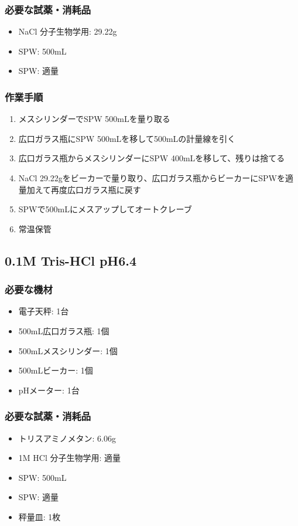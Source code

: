 \documentclass[titlepage,10pt,a4paper,uplatex]{jsbook}
\begin{document}
\subsubsection{必要な試薬・消耗品}
\begin{itemize}
\item NaCl 分子生物学用: 29.22g
\item SPW: 500mL
\item SPW: 適量
\end{itemize}

\subsubsection{作業手順}
\begin{enumerate}
\item メスシリンダーでSPW 500mLを量り取る
\item 広口ガラス瓶にSPW 500mLを移して500mLの計量線を引く
\item 広口ガラス瓶からメスシリンダーにSPW 400mLを移して、残りは捨てる
\item NaCl 29.22gをビーカーで量り取り、広口ガラス瓶からビーカーにSPWを適量加えて再度広口ガラス瓶に戻す
\item SPWで500mLにメスアップしてオートクレーブ
\item 常温保管
\end{enumerate}

\subsection{0.1M Tris-HCl pH6.4}

\subsubsection{必要な機材}
\begin{itemize}
\item 電子天秤: 1台
\item 500mL広口ガラス瓶: 1個
\item 500mLメスシリンダー: 1個
\item 500mLビーカー: 1個
\item pHメーター: 1台
\end{itemize}

\subsubsection{必要な試薬・消耗品}
\begin{itemize}
\item トリスアミノメタン: 6.06g
\item 1M HCl 分子生物学用: 適量
\item SPW: 500mL
\item SPW: 適量
\item 秤量皿: 1枚
\end{itemize}
\end{document}
